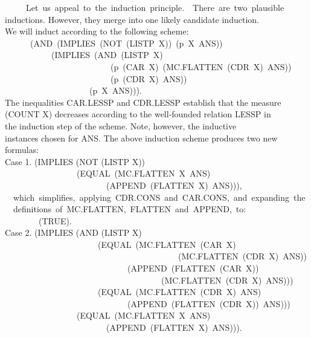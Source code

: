\documentclass[10pt]{book}
\newenvironment{pubasis}{\begin{flushleft}}{\end{flushleft}}
\begin{document}
\begin{pubasis}
~~~~~Let~us~appeal~to~the~induction~principle.~~There~are~two~plausible\\
inductions.  However, they merge into one likely candidate induction.\\
We will induct according to the following scheme:\\
~~~~~~(AND~(IMPLIES~(NOT~(LISTP~X))~(p~X~ANS))\\
~~~~~~~~~~~(IMPLIES~(AND~(LISTP~X)\\
~~~~~~~~~~~~~~~~~~~~~~~~~(p~(CAR~X)~(MC.FLATTEN~(CDR~X)~ANS))\\
~~~~~~~~~~~~~~~~~~~~~~~~~(p~(CDR~X)~ANS))\\
~~~~~~~~~~~~~~~~~~~~(p~X~ANS))).\\
The inequalities CAR.LESSP and CDR.LESSP establish that the measure\\
(COUNT X) decreases according to the well-founded relation LESSP in\\
the induction step of the scheme.  Note, however, the inductive\\
instances chosen for ANS.  The above induction scheme produces two new\\
formulas:\\

Case 1.	(IMPLIES (NOT (LISTP X))\\
~~~~~~~~~~~~~~~~~(EQUAL~(MC.FLATTEN~X~ANS)\\
~~~~~~~~~~~~~~~~~~~~~~~~(APPEND~(FLATTEN~X)~ANS))),\\

~~which~simplifies,~applying~CDR.CONS~and~CAR.CONS,~and~expanding~the\\
~~definitions~of~MC.FLATTEN,~FLATTEN~and~APPEND,~to:\\

~~~~~~~~(TRUE).\\

Case 2.	(IMPLIES (AND (LISTP X)\\
~~~~~~~~~~~~~~~~~~~~~~(EQUAL~(MC.FLATTEN~(CAR~X)\\
~~~~~~~~~~~~~~~~~~~~~~~~~~~~~~~~~~~~~~~~~(MC.FLATTEN~(CDR~X)~ANS))\\
~~~~~~~~~~~~~~~~~~~~~~~~~~~~~(APPEND~(FLATTEN~(CAR~X))\\
~~~~~~~~~~~~~~~~~~~~~~~~~~~~~~~~~~~~~(MC.FLATTEN~(CDR~X)~ANS)))\\
~~~~~~~~~~~~~~~~~~~~~~(EQUAL~(MC.FLATTEN~(CDR~X)~ANS)\\
~~~~~~~~~~~~~~~~~~~~~~~~~~~~~(APPEND~(FLATTEN~(CDR~X))~ANS)))\\
~~~~~~~~~~~~~~~~~(EQUAL~(MC.FLATTEN~X~ANS)\\
~~~~~~~~~~~~~~~~~~~~~~~~(APPEND~(FLATTEN~X)~ANS))).\\


\end{pubasis}
\end{document}
